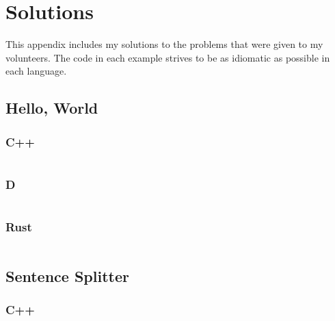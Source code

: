 \documentclass[finalcopy]{srpaper}
\begin{document}
\clearpage

\clearpage

\clearpage


\chapter{Solutions}\label{app:solutions}
This appendix includes my solutions to the problems that were given to my
volunteers. The code in each example strives to be as idiomatic as possible in
each language.


\section{Hello, World}
\subsection{C++}
\begin{mdframed}[linecolor=black]
\inputminted{cpp}{../examples/hello-world/hello_world.cpp}
\end{mdframed}

\subsection{D}
\begin{mdframed}[linecolor=black]
\inputminted{d}{../examples/hello-world/hello_world.d}
\end{mdframed}

\subsection{Rust}
\begin{mdframed}[linecolor=black]
\inputminted{rust}{../examples/hello-world/hello_world.rs}
\end{mdframed}

\section{Sentence Splitter}
\subsection{C++}
\begin{mdframed}[linecolor=black]
\inputminted[fontsize=\scriptsize]{cpp}{../examples/sentence-splitter/sentence_splitter.cpp}
\end{mdframed}
\end{document}
